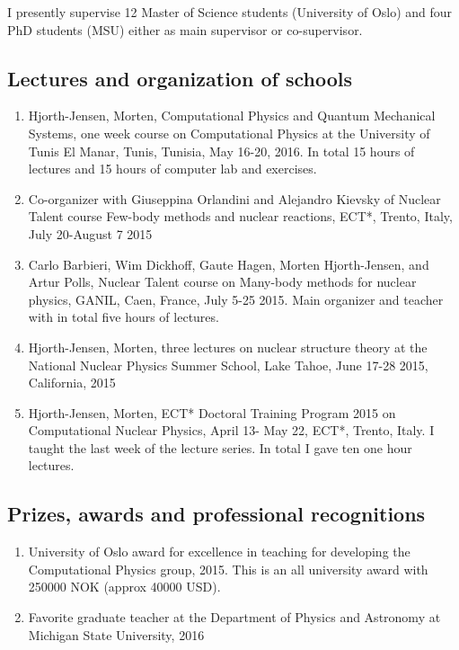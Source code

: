 \documentclass[prc,amsart,english,twocolumn,superscriptaddress,showpacs,floatfix]{revtex4}
\begin{document}
I presently supervise 12 Master of Science students (University of Oslo) and four PhD students (MSU) either as main supervisor or co-supervisor. 

\subsection*{Lectures and organization of schools}
\begin{enumerate}

\item Hjorth-Jensen, Morten, {Computational Physics and Quantum Mechanical Systems}, one week course on Computational Physics at the University of Tunis El Manar, Tunis, Tunisia, May 16-20, 2016. In total 15 hours of lectures and 15 hours of computer lab and exercises. 

\item Co-organizer with Giuseppina Orlandini and Alejandro Kievsky of Nuclear Talent course {Few-body methods and nuclear reactions}, ECT*, Trento, Italy, July 20-August 7 2015

\item Carlo Barbieri, Wim Dickhoff, Gaute Hagen, Morten Hjorth-Jensen, and Artur Polls, Nuclear Talent course on Many-body methods for nuclear physics, GANIL, Caen, France, July 5-25 2015. {Main organizer and teacher with in total five hours of lectures}. 

\item Hjorth-Jensen, Morten, three lectures on nuclear structure theory at the National Nuclear Physics Summer School, Lake Tahoe, June 17-28 2015, California, 2015

\item Hjorth-Jensen, Morten, ECT* {Doctoral Training Program 2015 on Computational Nuclear Physics}, April 13- May 22, ECT*, Trento, Italy. I taught the last week of the lecture series. In total I gave ten one hour lectures. 
\end{enumerate}


 \subsection*{Prizes, awards and professional recognitions}
\begin{enumerate}
\item University of Oslo award for excellence in teaching for developing the Computational Physics group, 2015. This is an all university award with 250000 NOK (approx 40000 USD).

\item Favorite graduate teacher at the Department of Physics and Astronomy at Michigan State University, 2016 
\end{enumerate}
\end{document}
